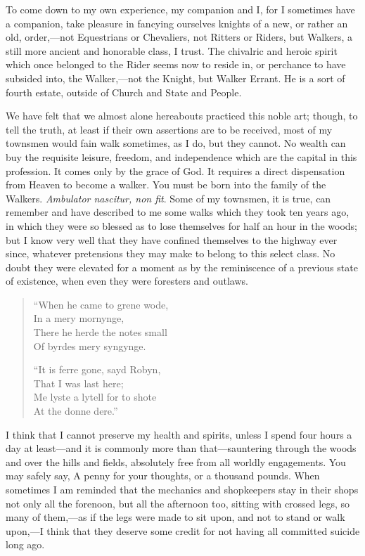 \documentclass[twoside,openright,10pt]{memoir} %
\begin{document}
To come down to my own experience, my companion and I, for I sometimes have a companion, take pleasure in fancying ourselves knights of a new, or rather an old, order,—not Equestrians or Chevaliers, not Ritters or Riders, but Walkers, a still more ancient and honorable class, I trust. The chivalric and heroic spirit which once belonged to the Rider seems now to reside in, or perchance to have subsided into, the Walker,—not the Knight, but Walker Errant. He is a sort of fourth estate, outside of Church and State and People.

We have felt that we almost alone hereabouts practiced this noble art; though, to tell the truth, at least if their own assertions are to be received, most of my townsmen would fain walk sometimes, as I do, but they cannot. No wealth can buy the requisite leisure, freedom, and independence which are the capital in this profession. It comes only by the grace of God. It requires a direct dispensation from Heaven to become a walker. You must be born into the family of the Walkers. \emph{Ambulator nascitur, non fit}. Some of my townsmen, it is true, can remember and have described to me some walks which they took ten years ago, in which they were so blessed as to lose themselves for half an hour in the woods; but I know very well that they have confined themselves to the highway ever since, whatever pretensions they may make to belong to this select class. No doubt they were elevated for a moment as by the reminiscence of a previous state of existence, when even they were foresters and outlaws.

\begin{verse}
“When he came to grene wode,\\
\hspace{1em}In a mery mornynge,\\
There he herde the notes small\\
\hspace{1em}Of byrdes mery syngynge.

“It is ferre gone, sayd Robyn,\\
\hspace{1em}That I was last here;\\
Me lyste a lytell for to shote\\
\hspace{1em}At the donne dere.”
\end{verse}

I think that I cannot preserve my health and spirits, unless I spend four hours a day at least—and it is commonly more than that—sauntering through the woods and over the hills and fields, absolutely free from all worldly engagements. You may safely say, A penny for your thoughts, or a thousand pounds. When sometimes I am reminded that the mechanics and shopkeepers stay in their shops not only all the forenoon, but all the afternoon too, sitting with crossed legs, so many of them,—as if the legs were made to sit upon, and not to stand or walk upon,—I think that they deserve some credit for not having all committed suicide long ago.
\end{document}
